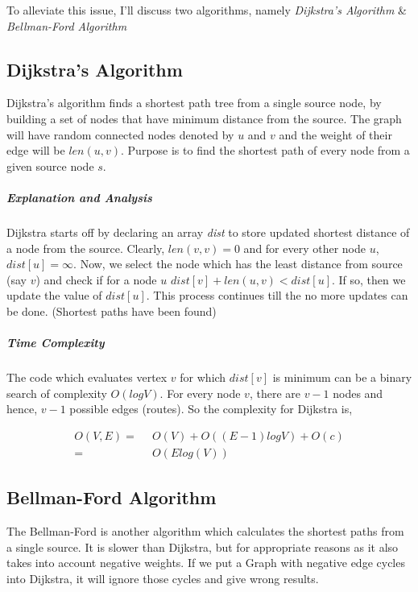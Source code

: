 \documentclass[11pt,a4paper]{extarticle}
\begin{document}
To alleviate this issue, I'll discuss two algorithms, namely \textit{Dijkstra's Algorithm} \& \textit{Bellman-Ford Algorithm}

\subsection{Dijkstra's Algorithm}
Dijkstra's algorithm finds a shortest path tree from a single source node, by building a set of nodes that have minimum distance from the source. The graph will have random connected nodes denoted by $u$ and $v$ and the weight of their edge will be $len(u,v)$. Purpose is to find the shortest path of every node from a given source node $s$.

\begin{adjustwidth}{2.5em}{0pt}

\end{adjustwidth}

\subparagraph{Explanation and Analysis}
Dijkstra starts off by declaring an array \textit{dist} to store updated shortest distance of a node from the source. Clearly, $len(v,v) = 0$ and for every other node $u$, $dist[u] = \infty$. Now, we select the node which has the least distance from source (say $v$) and check if for a node $u$ $dist[v] + len(u,v) < dist[u]$. If so, then we update the value of $dist[u]$. This process continues till the no more updates can be done. (Shortest paths have been found)

\subparagraph{Time Complexity}
The code which evaluates vertex $v$ for which $dist[v]$ is minimum can be a binary search of complexity $O(logV)$. For every node $v$, there are $v-1$ nodes and hence, $v-1$ possible edges (routes). So the complexity for Dijkstra is,

\begin{align}
O(V,E) =& \,\,\,O(V) + O((E-1)logV) + O(c)\\
	   =& \,\,\,O(Elog(V))
\end{align}

\subsection{Bellman-Ford Algorithm}
The Bellman-Ford is another algorithm which calculates the shortest paths from a single source. It is slower than Dijkstra, but for appropriate reasons as it also takes into account negative weights. If we put a Graph with negative edge cycles into Dijkstra, it will ignore those cycles and give wrong results.
\end{document}
